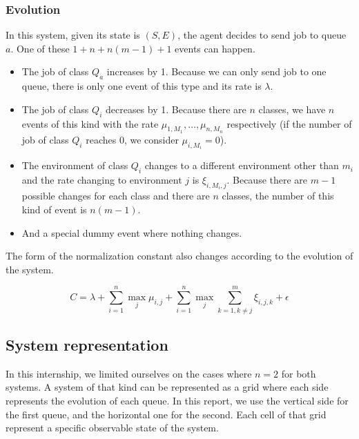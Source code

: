 \documentclass[
  a4paper, xcolor = usenames,dvipsnames]{article}
\providecommand{\tightlist}{%
  \setlength{\itemsep}{0pt}\setlength{\parskip}{0pt}}
\begin{document}
\hypertarget{evolution-1}{%
\subsubsection{Evolution}\label{evolution-1}}

In this system, given its state is \((S, E)\), the agent decides to send job to queue \(a\). One of these \(1 + n + n(m - 1) + 1\) events can happen.

\begin{itemize}
\tightlist
\item
  The job of class \(Q_{a}\) increases by 1. Because we can only send job to one queue, there is only one event of this type and its rate is \(\lambda\).
\item
  The job of class \(Q_{i}\) decreases by 1. Because there are \(n\) classes, we have \(n\) events of this kind with the rate \(\mu_{1, M_{1}}, \dots, \mu_{n, M_{n}}\) respectively (if the number of job of class \(Q_{i}\) reaches 0, we consider \(\mu_{i, M_{i}} = 0\)).
\item
  The environment of class \(Q_{i}\) changes to a different environment other than \(m_{i}\) and the rate changing to environment \(j\) is \(\xi_{i, M_{i}, j}\). Because there are \(m - 1\) possible changes for each class and there are \(n\) classes, the number of this kind of event is \(n(m - 1)\).
\item
  And a special dummy event where nothing changes.
\end{itemize}

The form of the normalization constant also changes according to the evolution of the system.

\[
C = \lambda + \sum_{i = 1}^{n} \max_{j} \mu_{i, j} + \sum_{i = 1}^{n} \max_{j} \sum_{k = 1, k \neq j}^{m} \xi_{i, j, k} + \epsilon
\]

\hypertarget{system-representation}{%
\subsection{System representation}\label{system-representation}}

In this internship, we limited ourselves on the cases where \(n = 2\) for both systems. A system of that kind can be represented as a grid where each side represents the evolution of each queue. In this report, we use the vertical side for the first queue, and the horizontal one for the second. Each cell of that grid represent a specific observable state of the system.
\end{document}
